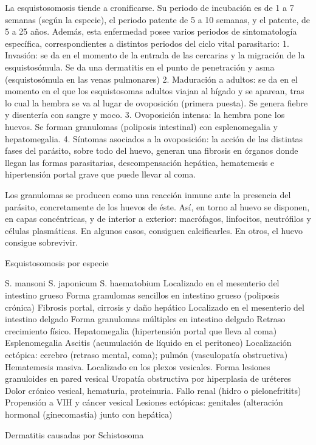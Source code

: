 La esquistosomosis tiende a cronificarse. Su periodo de incubación es de 1 a 7 semanas (según la especie), el periodo patente de 5 a 10 semanas, y el patente, de 5 a 25 años. Además, esta enfermedad posee varios periodos de sintomatología específica, correspondientes a distintos periodos del ciclo vital parasitario:
1. Invasión: se da en el momento de la entrada de las cercarias y la migración de la esquistosómula. Se da una dermatitis en el punto de penetración y asma (esquistosómula en las venas pulmonares)
2. Maduración a adultos: se da en el momento en el que los esquistosomas adultos viajan al hígado y se aparean, tras lo cual la hembra se va al lugar de ovoposición (primera puesta). Se genera fiebre y disentería con sangre y moco. 
3. Ovoposición intensa: la hembra pone los huevos. Se forman granulomas (poliposis intestinal) con esplenomegalia y hepatomegalia.
4. Síntomas asociados a la ovoposición: la acción de las distintas fases del parásito, sobre todo del huevo, generan una fibrosis en órganos donde llegan las formas parasitarias, descompensación hepática, hematemesis e hipertensión portal grave que puede llevar al coma.

Los granulomas se producen como una reacción inmune ante la presencia del parásito, concretamente de los huevos de éste. Así, en torno al huevo se disponen, en capas concéntricas, y de interior a exterior: macrófagos, linfocitos, neutrófilos y células plasmáticas. En algunos casos, consiguen calcificarles. En otros, el huevo consigue sobrevivir.

Esquistosomosis por especie

S. mansoni
S. japonicum
S. haematobium
Localizado en el mesenterio del intestino grueso
Forma granulomas sencillos en intestino grueso (poliposis crónica)
Fibrosis portal, cirrosis y daño hepático
Localizado en el mesenterio del intestino delgado
Forma granulomas múltiples en intestino delgado
Retraso crecimiento físico.
Hepatomegalia (hipertensión portal que lleva al coma)
Esplenomegalia
Ascitis (acumulación de líquido en el peritoneo)
Localización ectópica: cerebro (retraso mental, coma); pulmón (vasculopatía obstructiva)
Hematemesis masiva.
Localizado en los plexos vesicales.
Forma lesiones granuloides en pared vesical
Uropatía obstructiva por hiperplasia de uréteres
Dolor crónico vesical, hematuria, proteinuria.
Fallo renal (hidro o pielonefritits)
Propensión a VIH y cáncer vesical
Lesiones ectópicas: genitales (alteración hormonal (ginecomastia) junto con hepática)

Dermatitis causadas por Schistosoma

